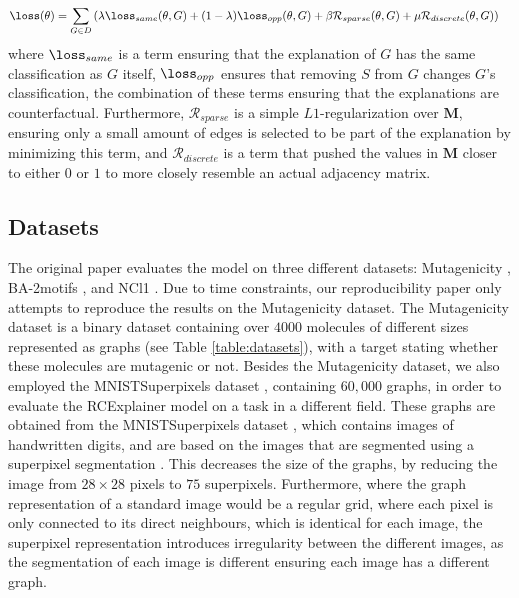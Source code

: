 \begin{align}
    \loss(\theta) &= \sum_{G \in D} \left( \lambda \loss_{same}(\theta, G) + (1 - \lambda)\loss_{opp}(\theta, G) + \beta \mathcal{R}_{sparse}(\theta, G) + \mu \mathcal{R}_{discrete}(\theta, G)\right)
\end{align}
where $\loss_{same}$ is a term ensuring that the explanation of $G$ has the same classification as $G$ itself, $\loss_{opp}$ ensures that removing $S$ from $G$ changes $G$'s classification, the combination of these terms ensuring that the explanations are counterfactual. Furthermore, $\mathcal{R}_{sparse}$ is a simple $L1$-regularization over $\textbf{M}$, ensuring only a small amount of edges is selected to be part of the explanation by minimizing this term, and $\mathcal{R}_{discrete}$ is a term that pushed the values in $\textbf{M}$ closer to either $0$ or $1$ to more closely resemble an actual adjacency matrix.

\subsection{Datasets}
The original paper evaluates the model on three different datasets: Mutagenicity \cite{mutagenicity}, BA-2motifs \cite{luo2020parameterized}, and NCl1 \cite{nci1}. Due to time constraints, our reproducibility paper only attempts to reproduce the results on the Mutagenicity dataset. The Mutagenicity dataset is a binary dataset containing over $4000$ molecules of different sizes represented as graphs (see Table \ref{table:datasets}), with a target stating whether these molecules are mutagenic or not.
Besides the Mutagenicity dataset, we also employed the MNISTSuperpixels dataset \cite{monti2016geometric}, containing $60,000$ graphs, in order to evaluate the RCExplainer model on a task in a different field. These graphs are obtained from the MNISTSuperpixels dataset \cite{lecun2010mnist}, which contains images of handwritten digits, and are based on the images that are segmented using a superpixel segmentation \cite{superpixels}. This decreases the size of the graphs, by reducing the image from $28 \times 28$ pixels to $75$ superpixels. Furthermore, where the graph representation of a standard image would be a regular grid, where each pixel is only connected to its direct neighbours, which is identical for each image, the superpixel representation introduces irregularity between the different images, as the segmentation of each image is different ensuring each image has a different graph.

